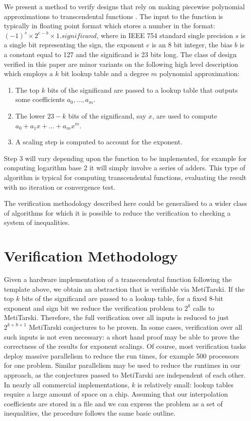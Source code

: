 \documentclass[a4]{article}
\begin{document}
We present a method to verify designs that rely on making piecewise polynomial approximations to transcendental functions \cite{tang1991table,strollo2011elementary,pineiro2005high}. The input to the function is typically in floating point format \cite{goldberg1991every} which stores a number in the format: $(-1)^{s} \times 2^{e-b} \times 1.\textit{significand}$, where in IEEE 754 standard single precision $s$ is a single bit representing the sign, the exponent $e$ is an 8 bit integer, the bias $b$ is a constant equal to 127 and the significand is 23 bits long. The class of design verified in this paper are minor variants on the following high level description which employs a $k$ bit lookup table and a degree $m$ polynomial approximation:
\begin{enumerate}
\item The top $k$ bits of the significand are passed to a lookup table that outputs some coefficients $a_0,...,a_m$.
\item The lower $23-k$ bits of the significand, say $x$, are used to compute\newline $a_0+a_1x+...+a_mx^m$.
\item A scaling step is computed to account for the exponent.
\end{enumerate} 
Step 3 will vary depending upon the function to be implemented, for example for computing logarithm base 2 it will simply involve a series of adders. This type of algorithm is typical for computing transcendental functions, evaluating the result with no iteration or convergence test.

The verification methodology described here could be generalised to a wider class of algorithms for which it is possible to reduce the verification to checking a system of inequalities. 


\section{Verification Methodology}
Given a hardware implementation of a transcendental function following the template above, we obtain an abstraction that is verifiable via MetiTarski. If the top $k$ bits of the significand are passed to a lookup table, for a fixed 8-bit exponent and sign bit we reduce the verification problem to $2^k$ calls to MetiTarski. Therefore, the  full verification over all inputs is reduced to 
just $2^{k+8+1}$ MetiTarski conjectures to be proven. In some cases, verification over all such inputs is not even necessary: a short hand proof may be able to prove the correctness of the results for exponent scalings. Of course, most verification tasks deploy massive parallelism to reduce the run times, for example 500 processors for one problem. Similar parallelism may be used to reduce the runtimes in our approach, as the conjectures passed to MetiTarski are independent of each other. In nearly all commercial implementations, $k$ is relatively small: lookup tables require a large amount of space on a chip. Assuming that our interpolation coefficients are stored in a file and we can express the problem as a set of inequalities, the procedure follows the same basic outline.
\end{document}
